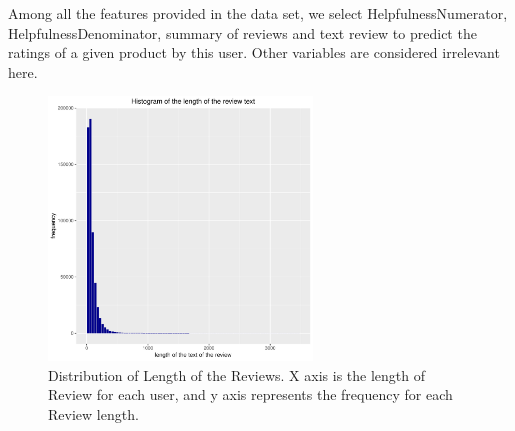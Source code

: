\documentclass[letterpaper]{article} %
\begin{document}
\begin{table}
\centering
{}
\caption{Summary for Variables in Amazon Fine Food Review}\smallskip
\label{table1}
\end{table}

Among all the features provided in the data set, we select HelpfulnessNumerator, HelpfulnessDenominator, summary of reviews and text review to predict the ratings of a given product by this user. Other variables are considered irrelevant here.


\begin{figure}[!h]
\centering
\includegraphics[height=7cm,width=0.9\columnwidth]{pics//plot_t_len.pdf} %
\caption{Distribution of Length of the Reviews. X axis is the length of Review for each user, and y axis represents the frequency for each Review length.}
\label{Review Length}
\end{figure}
\end{document}
